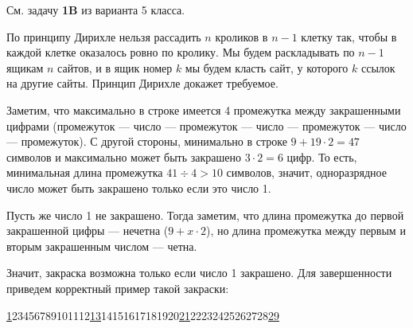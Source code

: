 ﻿
\begin{itemize}
\itA См. задачу {\bfseries 1B} из варианта 5 класса.

\itB По принципу Дирихле нельзя рассадить $n$ кроликов в $n-1$ клетку так, 
чтобы в каждой клетке оказалось ровно по кролику.
Мы будем раскладывать по $n-1$ ящикам $n$ сайтов, и в ящик номер $k$ мы будем класть
сайт, у которого $k$ ссылок на другие сайты. Принцип Дирихле докажет требуемое.

\itC Заметим, что максимально в строке имеется 4 промежутка между закрашенными цифрами
(промежуток --- число --- промежуток --- число --- промежуток --- число --- промежуток).
С другой стороны, минимально в строке $9 + 19\cdot 2 = 47$ символов и максимально может 
быть закрашено $3 \cdot 2 = 6$ цифр.
То есть, минимальная длина промежутка $41 \div 4 > 10$ символов, значит, одноразрядное
число может быть закрашено только если это число 1.

Пусть же число 1 не закрашено. Тогда заметим, что длина
промежутка до первой закрашенной цифры --- нечетна ($9 + x \cdot 2$), но длина промежутка
между первым и вторым закрашенным числом --- четна.

Значит, закраска возможна только если число 1 закрашено.
Для завершенности приведем корректный пример такой закраски:

\begin{center}
{\underline{1}}23456789101112{\underline{13}}14151617181920{\underline{21}}22232425262728{\underline{29}}
\end{center}

\end{itemize}
